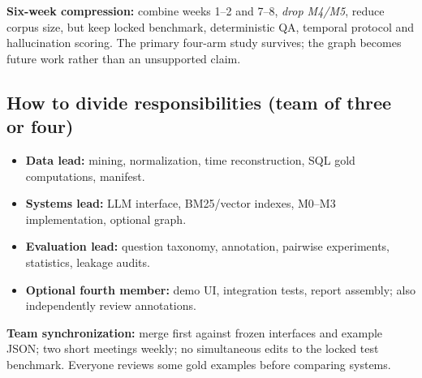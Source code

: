 \documentclass[11pt,a4paper]{article}
\begin{document}
\textbf{Six-week compression:} combine weeks 1--2 and 7--8, \emph{drop M4/M5}, reduce corpus size, but keep locked benchmark, deterministic QA, temporal protocol and hallucination scoring. The primary four-arm study survives; the graph becomes future work rather than an unsupported claim.

\subsection{How to divide responsibilities (team of three or four)}
\begin{itemize}
\item \textbf{Data lead:} mining, normalization, time reconstruction, SQL gold computations, manifest.
\item \textbf{Systems lead:} LLM interface, BM25/vector indexes, M0--M3 implementation, optional graph.
\item \textbf{Evaluation lead:} question taxonomy, annotation, pairwise experiments, statistics, leakage audits.
\item \textbf{Optional fourth member:} demo UI, integration tests, report assembly; also independently review annotations.
\end{itemize}
\textbf{Team synchronization:} merge first against frozen interfaces and example JSON; two short meetings weekly; no simultaneous edits to the locked test benchmark. Everyone reviews some gold examples before comparing systems.
\end{document}
